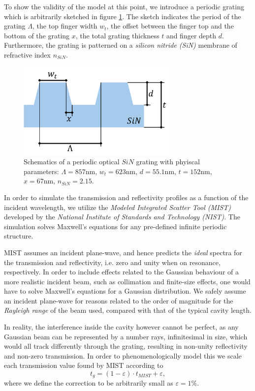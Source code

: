 To show the validity of the model at this point, we introduce a periodic grating which is arbitrarily sketched in figure \ref{fig:MIST_grating_sketch}. The sketch indicates the period of the grating $\Lambda$, the top finger width $w_t$, the offset between the finger top and the bottom of the grating $x$, the total grating thickness $t$ and finger depth $d$. Furthermore, the grating is patterned on a \emph{silicon nitride (SiN)} membrane  of refractive index $n_{SiN}$. 

\begin{figure}[h!]
    \centering
    \includegraphics[width=0.7\textwidth]{figures/grating_MIST_sketch.pdf}
    \caption{Schematics of a periodic optical $SiN$ grating with phyiscal parameters: $\Lambda = 857$nm, $w_t = 623$nm, $d = 55.1$nm, $t = 152$nm, $x = 67$nm, $n_{SiN} = 2.15$.}
    \label{fig:MIST_grating_sketch}
\end{figure}


In order to simulate the transmission and reflectivity profiles as a function of the incident wavelength, we utilize the \emph{Modeled Integrated Scatter Tool (MIST)} developed by the \emph{National Institute of Standards and Technology (NIST)}\cite{MIST}. The simulation solves Maxwell's equations for any pre-defined infinite periodic structure. 

MIST assumes an incident plane-wave, and hence predicts the \emph{ideal} spectra for the transmission and reflectivity, i.e. zero and unity when on resonance, respectively. In order to include effects related to the Gaussian behaviour of a more realistic incident beam, such as collimation and finite-size effects\cite{Toft-Vandborg}, one would have to solve Maxwell's equations for a Gaussian distribution. We safely assume an incident plane-wave for reasons related to the order of magnitude for the \emph{Rayleigh range} of the beam used, compared with that of the typical cavity length.

In reality, the interference inside the cavity however cannot be perfect, as any Gaussian beam can be represented by a number rays, infinitesimal in size, which would all track differently through the grating, resulting in non-unity reflectivity and non-zero transmission. In order to phenomenologically model this we scale each transmission value found by MIST according to
\begin{equation}
    t_g = (1 - \varepsilon) \cdot t_{MIST} + \varepsilon,
    \label{eq:trans_correction_MIST}
\end{equation}
where we define the correction to be arbitrarily small as $\varepsilon = 1\%$.

